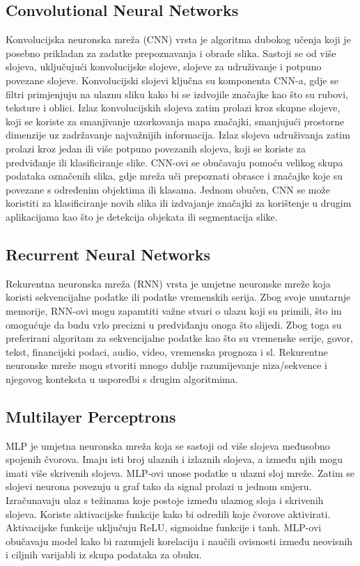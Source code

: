 \documentclass[]{foi}
\begin{document}
\subsection{Convolutional Neural Networks}
Konvolucijska neuronska mreža (CNN) vrsta je algoritma dubokog učenja koji je posebno prikladan za zadatke prepoznavanja i obrade slika. Sastoji se od više slojeva, uključujući konvolucijske slojeve, slojeve za udruživanje i potpuno povezane slojeve. 
Konvolucijski slojevi ključna su komponenta CNN-a, gdje se filtri primjenjuju na ulaznu sliku kako bi se izdvojile značajke kao što su rubovi, teksture i oblici. Izlaz konvolucijskih slojeva zatim prolazi kroz skupne slojeve, koji se koriste za smanjivanje uzorkovanja mapa značajki, smanjujući prostorne dimenzije uz zadržavanje najvažnijih informacija. Izlaz slojeva udruživanja zatim prolazi kroz jedan ili više potpuno povezanih slojeva, koji se koriste za predviđanje ili klasificiranje slike. 
CNN-ovi se obučavaju pomoću velikog skupa podataka označenih slika, gdje mreža uči prepoznati obrasce i značajke koje su povezane s određenim objektima ili klasama. Jednom obučen, CNN se može koristiti za klasificiranje novih slika ili izdvajanje značajki za korištenje u drugim aplikacijama kao što je detekcija objekata ili segmentacija slike. \cite{GeeksforGeeks2020}

\subsection{Recurrent Neural Networks}
Rekurentna neuronska mreža (RNN) vrsta je umjetne neuronske mreže koja koristi sekvencijalne podatke ili podatke vremenskih serija. Zbog svoje unutarnje memorije, RNN-ovi mogu zapamtiti važne stvari o ulazu koji su primili, što im omogućuje da budu vrlo precizni u predviđanju onoga što slijedi. Zbog toga su preferirani algoritam za sekvencijalne podatke kao što su vremenske serije, govor, tekst, financijski podaci, audio, video, vremenska prognoza i sl. Rekurentne neuronske mreže mogu stvoriti mnogo dublje razumijevanje niza/sekvence i njegovog konteksta u usporedbi s drugim algoritmima. \cite{Donges}

\subsection{Multilayer Perceptrons}
MLP je umjetna neuronska mreža koja se sastoji od više slojeva međusobno spojenih čvorova. Imaju isti broj ulaznih i izlaznih slojeva, a između njih mogu imati više skrivenih slojeva. 
MLP-ovi unose podatke u ulazni sloj mreže. Zatim se slojevi neurona povezuju u graf tako da signal prolazi u jednom smjeru. Izračunavaju ulaz s težinama koje postoje između ulaznog sloja i skrivenih slojeva. Koriste aktivacijske funkcije kako bi odredili koje čvorove aktivirati. Aktivacijske funkcije uključuju ReLU, sigmoidne funkcije i tanh. MLP-ovi obučavaju model kako bi razumjeli korelaciju i naučili ovisnosti između neovisnih i ciljnih varijabli iz skupa podataka za obuku. \cite{Simplilearn}


\makebackmatter
\end{document}
